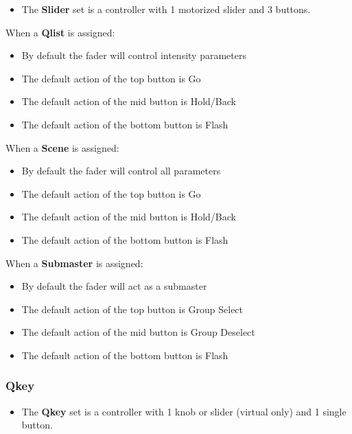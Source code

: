 \documentclass[
]{article}
\providecommand{\tightlist}{%
  \setlength{\itemsep}{0pt}\setlength{\parskip}{0pt}}
\begin{document}
\begin{itemize}
\tightlist
\item
  The \textbf{Slider} set is a controller with 1 motorized slider and 3 buttons.
\end{itemize}

When a \textbf{Qlist} is assigned:

\begin{itemize}
\item
  By default the fader will control intensity parameters
\item
  The default action of the top button is Go
\item
  The default action of the mid button is Hold/Back
\item
  The default action of the bottom button is Flash
\end{itemize}

When a \textbf{Scene} is assigned:

\begin{itemize}
\item
  By default the fader will control all parameters
\item
  The default action of the top button is Go
\item
  The default action of the mid button is Hold/Back
\item
  The default action of the bottom button is Flash
\end{itemize}

When a \textbf{Submaster} is assigned:

\begin{itemize}
\item
  By default the fader will act as a submaster
\item
  The default action of the top button is Group Select
\item
  The default action of the mid button is Group Deselect
\item
  The default action of the bottom button is Flash
\end{itemize}

\hypertarget{qkey}{%
\subsubsection{Qkey}\label{qkey}}

\begin{itemize}
\tightlist
\item
  The \textbf{Qkey} set is a controller with 1 knob or slider (virtual only) and 1 single button.
\end{itemize}
\end{document}
